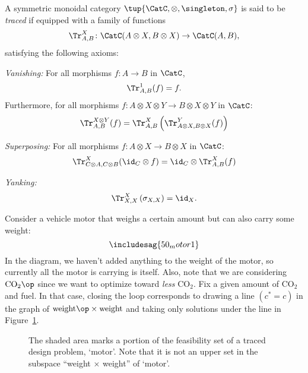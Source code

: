 \begin{shaded}
\begin{definition}
A symmetric monoidal category $\tup{\CatC, \otimes, \singleton, \sigma}$ is said to be \emph{traced} if equipped with a family of functions
\begin{equation}
    \Tr_{A,B}^X\colon \CatC(A\otimes X, B\otimes X)\to \CatC(A,B),
\end{equation}
satisfying the following axioms:
\begin{compactenum}
    \item \emph{Vanishing:} For all morphisms $f\colon A\to B$ in $\CatC$,
    \begin{equation}
    \Tr_{A,B}^1(f)=f.
    \end{equation}
    Furthermore, for all morphisms $f\colon A\otimes X \otimes Y \to B\otimes X \otimes Y$ in $\CatC$:
    \begin{equation}
        \Tr_{A,B}^{X\otimes Y}(f)=\Tr_{A,B}^X\left(
        \Tr_{A\otimes X,B\otimes X}^Y(f)\right)
    \end{equation}
    \item \emph{Superposing:} For all morphisms $f\colon A\otimes X\to B\otimes X$ in $\CatC$:
    \begin{equation}
        \Tr_{C\otimes A,C\otimes B}^{X}(\id_C\otimes f)=\id_C\otimes \Tr_{A,B}^X(f)
    \end{equation}
    \item \emph{Yanking:} 
    \begin{equation}
    \Tr_{X,X}^X\left(\sigma_{X,X}\right)=\id_X.
    \end{equation}
\end{compactenum}
\end{definition}
\end{shaded}

\begin{example}Consider a vehicle motor that weighs a certain amount but can also carry some weight:
\[
\includesag{50_motor1}
\]
In the diagram, we haven't added anything to the weight of the motor, so currently all the motor is carrying is itself. Also, note that we are considering $\text{CO}_2\op$ since we want to optimize toward \emph{less} CO$_2$. Fix a given amount of CO$_2$ and fuel. In that case, closing the loop corresponds to drawing a line $(c^\ast = c)$ in the graph of $\text{weight}\op \times \text{weight}$ and taking only solutions under the line in Figure~\ref{fig:weightcarrier}.
\begin{figure}[h!]
\centering
{}
\caption{The shaded area marks a portion of the feasibility set of a traced design problem, `motor'. Note that it is not an upper set in the subspace ``weight $\times$ weight'' of `motor'.}
\label{fig:weightcarrier}
\end{figure}
\end{example}

